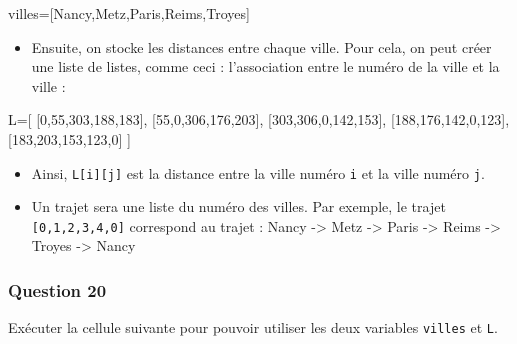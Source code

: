 \documentclass[
  paper=a4,
  ,captions=tableheading
]{scrartcl}
\newenvironment{Shaded}{}{}
\newcommand{\NormalTok}[1]{#1}
\providecommand{\tightlist}{%
  \setlength{\itemsep}{0pt}\setlength{\parskip}{0pt}}
\begin{document}
\begin{Shaded}
\begin{Highlighting}[]
\NormalTok{villes=[\textquotesingle{}Nancy\textquotesingle{},\textquotesingle{}Metz\textquotesingle{},\textquotesingle{}Paris\textquotesingle{},\textquotesingle{}Reims\textquotesingle{},\textquotesingle{}Troyes\textquotesingle{}]}
\end{Highlighting}
\end{Shaded}

\begin{itemize}
\tightlist
\item
  Ensuite, on stocke les distances entre chaque ville. Pour cela, on
  peut créer une liste de listes, comme ceci : l'association entre le
  numéro de la ville et la ville :
\end{itemize}

\begin{Shaded}
\begin{Highlighting}[]
\NormalTok{L=[ }
\NormalTok{    [0,55,303,188,183],}
\NormalTok{    [55,0,306,176,203],}
\NormalTok{    [303,306,0,142,153],}
\NormalTok{    [188,176,142,0,123],}
\NormalTok{    [183,203,153,123,0]}
\NormalTok{]}
\end{Highlighting}
\end{Shaded}

\begin{itemize}
\tightlist
\item
  Ainsi, \texttt{L{[}i{]}{[}j{]}} est la distance entre la ville numéro
  \texttt{i} et la ville numéro \texttt{j}.
\item
  Un trajet sera une liste du numéro des villes. Par exemple, le trajet
  \texttt{{[}0,1,2,3,4,0{]}} correspond au trajet : Nancy
  -\textgreater{} Metz -\textgreater{} Paris -\textgreater{} Reims
  -\textgreater{} Troyes -\textgreater{} Nancy
\end{itemize}

\hypertarget{question-20}{%
\subsubsection{Question 20}\label{question-20}}

Exécuter la cellule suivante pour pouvoir utiliser les deux variables
\texttt{villes} et \texttt{L}.
\end{document}

